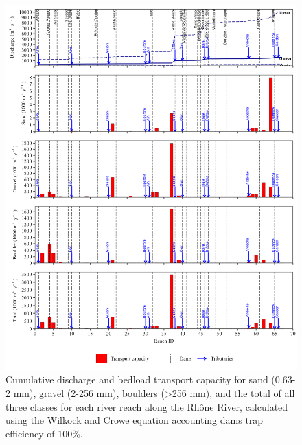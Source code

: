 \documentclass[
]{book}
\begin{document}
\begin{figure}
\includegraphics[width=26.24in]{img/res_cascade/res_E3_eW&C/plots_tr_cap-silt/tr_cap_res_sum_hy_E3_eW&C} \caption{Cumulative discharge and bedload transport capacity for sand (0.63-2 mm), gravel (2-256 mm), boulders (>256 mm), and the total of all three classes for each river reach along the Rhône River, calculated using the Wilkock and Crowe equation accounting dams trap efficiency of 100\%.}\label{fig:TrcE3eW}
\end{figure}
\end{document}
